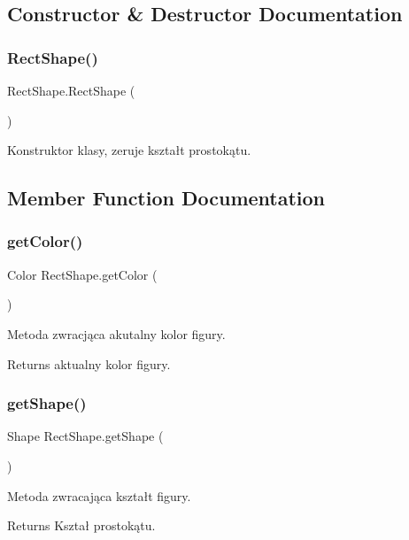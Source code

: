 \subsection{Constructor \& Destructor Documentation}
\mbox{\label{class_rect_shape_a86cf01c77c39a2052a3706747c9ae27e}} 
\subsubsection{Rect\+Shape()}
{\footnotesize\ttfamily Rect\+Shape.\+Rect\+Shape (\begin{DoxyParamCaption}{ }\end{DoxyParamCaption})}

Konstruktor klasy, zeruje kształt prostokątu. 

\subsection{Member Function Documentation}
\mbox{\label{class_rect_shape_a313190c5754f9d952657f3234cbc50ff}} 
\subsubsection{get\+Color()}
{\footnotesize\ttfamily Color Rect\+Shape.\+get\+Color (\begin{DoxyParamCaption}{ }\end{DoxyParamCaption})}

Metoda zwracjąca akutalny kolor figury. \begin{DoxyReturn}{Returns}
aktualny kolor figury. 
\end{DoxyReturn}
\mbox{\label{class_rect_shape_ae9313879935fedaa1a1f881fbab9b9cf}} 
\subsubsection{get\+Shape()}
{\footnotesize\ttfamily Shape Rect\+Shape.\+get\+Shape (\begin{DoxyParamCaption}{ }\end{DoxyParamCaption})}

Metoda zwracająca kształt figury. \begin{DoxyReturn}{Returns}
Kształ prostokątu. 
\end{DoxyReturn}
\mbox{\label{class_rect_shape_a326606d5a71b40cb81324c9222f341e0}} 
